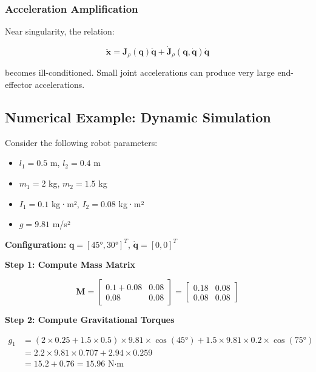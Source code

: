 \subsubsection{Acceleration Amplification}

Near singularity, the relation:

\begin{equation}
\ddot{\mathbf{x}} = \mathbf{J}_{\rho}(\mathbf{q}) \ddot{\mathbf{q}} + \dot{\mathbf{J}}_{\rho}(\mathbf{q}, \dot{\mathbf{q}}) \dot{\mathbf{q}}
\end{equation}

becomes ill-conditioned. Small joint accelerations can produce very large end-effector accelerations.

\subsection{Numerical Example: Dynamic Simulation}

Consider the following robot parameters:
\begin{itemize}
    \item $l_1 = 0.5$ m, $l_2 = 0.4$ m
    \item $m_1 = 2$ kg, $m_2 = 1.5$ kg
    \item $I_1 = 0.1$ kg·m², $I_2 = 0.08$ kg·m²
    \item $g = 9.81$ m/s²
\end{itemize}

\textbf{Configuration:} $\mathbf{q} = [45°, 30°]^T$, $\dot{\mathbf{q}} = [0, 0]^T$

\textbf{Step 1: Compute Mass Matrix}

\begin{equation}
\mathbf{M} = \begin{bmatrix}
0.1 + 0.08 & 0.08 \\
0.08 & 0.08
\end{bmatrix} = \begin{bmatrix}
0.18 & 0.08 \\
0.08 & 0.08
\end{bmatrix}
\end{equation}

\textbf{Step 2: Compute Gravitational Torques}

\begin{align}
g_1 &= (2 \times 0.25 + 1.5 \times 0.5) \times 9.81 \times \cos(45°) + 1.5 \times 9.81 \times 0.2 \times \cos(75°) \\
&= 2.2 \times 9.81 \times 0.707 + 2.94 \times 0.259 \\
&= 15.2 + 0.76 = 15.96 \text{ N·m}
\end{align}

